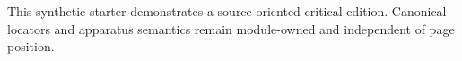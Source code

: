 \documentclass[10pt,twoside,openany]{book}
\begin{document}
\PSEBeginFrontMatter
\PSETitlePage
\PSEPublicationPage
{}
This synthetic starter demonstrates a source-oriented critical edition. Canonical locators and apparatus semantics remain module-owned and independent of page position.
\tableofcontents
\clearpage
\PSEBeginBody

\PSEBeginBackMatter
{}


\PSEPrintBibliography
\PSEPrintIndex
\end{document}

